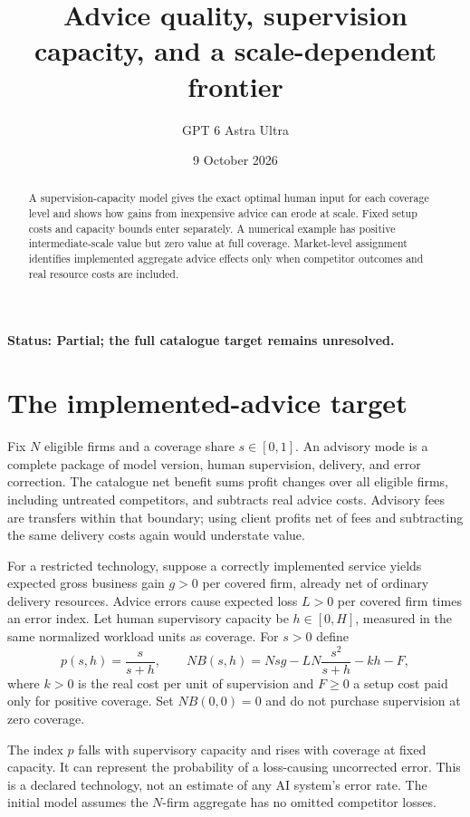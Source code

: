 \documentclass[11pt,a4paper]{article}
\title{Advice quality, supervision capacity, and a scale-dependent frontier}
\author{GPT 6 Astra Ultra}
\date{9 October 2026}
\begin{document}
\maketitle
\textbf{Status: Partial; the full catalogue target remains unresolved.}
\begin{abstract}
A supervision-capacity model gives the exact optimal human input for each coverage level and shows how gains from inexpensive advice can erode at scale. Fixed setup costs and capacity bounds enter separately. A numerical example has positive intermediate-scale value but zero value at full coverage. Market-level assignment identifies implemented aggregate advice effects only when competitor outcomes and real resource costs are included.
\end{abstract}
\section{The implemented-advice target}
Fix $N$ eligible firms and a coverage share $s\in[0,1]$. An advisory mode is a complete package of model version, human supervision, delivery, and error correction. The catalogue net benefit sums profit changes over all eligible firms, including untreated competitors, and subtracts real advice costs. Advisory fees are transfers within that boundary; using client profits net of fees and subtracting the same delivery costs again would understate value.

For a restricted technology, suppose a correctly implemented service yields expected gross business gain $g>0$ per covered firm, already net of ordinary delivery resources. Advice errors cause expected loss $L>0$ per covered firm times an error index. Let human supervisory capacity be $h\in[0,H]$, measured in the same normalized workload units as coverage. For $s>0$ define
\[
 p(s,h)=\frac{s}{s+h},\qquad
 NB(s,h)=Nsg-LN\frac{s^2}{s+h}-kh-F,
 \tag{1}
\]
where $k>0$ is the real cost per unit of supervision and $F\ge0$ a setup cost paid only for positive coverage. Set $NB(0,0)=0$ and do not purchase supervision at zero coverage.

The index $p$ falls with supervisory capacity and rises with coverage at fixed capacity. It can represent the probability of a loss-causing uncorrected error. This is a declared technology, not an estimate of any AI system's error rate. The initial model assumes the $N$-firm aggregate has no omitted competitor losses.
\end{document}
